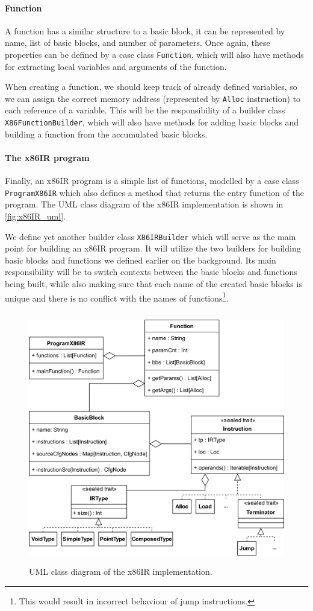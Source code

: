 \documentclass[thesis=M,english]{FITthesis}[2019/12/23]
\begin{document}
\paragraph*{Function} A function has a similar structure to a basic block, it can be represented by name, list of basic blocks, and number of parameters. Once again, these properties can be defined by a case class \texttt{Function}, which will also have methods for extracting local variables and arguments of the function.

When creating a function, we should keep track of already defined variables, so we can assign the correct memory address (represented by \texttt{Alloc} instruction) to each reference of a variable. This will be the responsibility of a builder class \texttt{X86FunctionBuilder}, which will also have methods for adding basic blocks and building a function from the accumulated basic blocks.

\paragraph*{The x86IR program} Finally, an x86IR program is a simple list of functions, modelled by a case class \texttt{ProgramX86IR} which also defines a method that returns the entry function of the program. The UML class diagram of the x86IR implementation is shown in \autoref{fig:x86IR_uml}.

We define yet another builder class \texttt{X86IRBuilder} which will serve as the main point for building an x86IR program. It will utilize the two builders for building basic blocks and functions we defined earlier on the background. Its main responsibility will be to switch contexts between the basic blocks and functions being built, while also making sure that each name of the created basic blocks is unique and there is no conflict with the names of functions\footnote{This would result in incorrect behaviour of jump instructions.}.

\begin{figure}
    \centering
    \includegraphics[height=11cm]{img/x86IR_uml.png}
    \caption{UML class diagram of the x86IR implementation.}\label{fig:x86IR_uml}
\end{figure}
\end{document}
